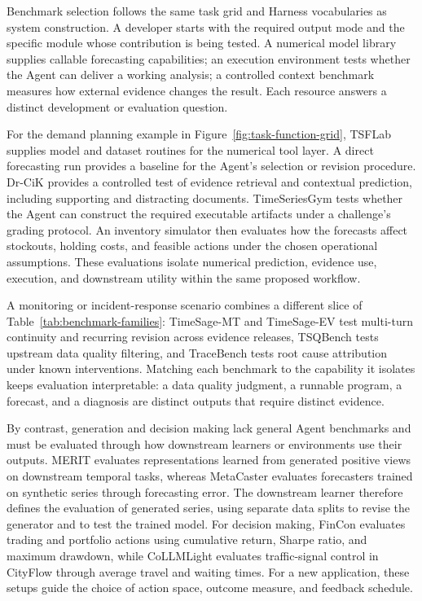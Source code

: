 \documentclass[preprints,article,submit,moreauthors]{Definitions/mdpi}
\begin{document}
Benchmark selection follows the same task grid and Harness vocabularies as system construction. A developer starts with the required output mode and the specific module whose contribution is being tested. A numerical model library supplies callable forecasting capabilities; an execution environment tests whether the Agent can deliver a working analysis; a controlled context benchmark measures how external evidence changes the result. Each resource answers a distinct development or evaluation question.

For the demand planning example in Figure~\ref{fig:task-function-grid}, TSFLab \citep{tsflab2026} supplies model and dataset routines for the numerical tool layer. A direct forecasting run provides a baseline for the Agent's selection or revision procedure. Dr-CiK \citep{drcik2026} provides a controlled test of evidence retrieval and contextual prediction, including supporting and distracting documents. TimeSeriesGym \citep{timeseriesgym2025} tests whether the Agent can construct the required executable artifacts under a challenge's grading protocol. An inventory simulator then evaluates how the forecasts affect stockouts, holding costs, and feasible actions under the chosen operational assumptions. These evaluations isolate numerical prediction, evidence use, execution, and downstream utility within the same proposed workflow.

A monitoring or incident-response scenario combines a different slice of Table~\ref{tab:benchmark-families}: TimeSage-MT \citep{timesagemt2026} and TimeSage-EV \citep{timesageev2026} test multi-turn continuity and recurring revision across evidence releases, TSQBench \citep{tsqbench2026} tests upstream data quality filtering, and TraceBench \citep{tracebench2026} tests root cause attribution under known interventions. Matching each benchmark to the capability it isolates keeps evaluation interpretable: a data quality judgment, a runnable program, a forecast, and a diagnosis are distinct outputs that require distinct evidence.

By contrast, generation and decision making lack general Agent benchmarks and must be evaluated through how downstream learners or environments use their outputs. MERIT \citep{merit2025} evaluates representations learned from generated positive views on downstream temporal tasks, whereas MetaCaster \citep{metacaster2026} evaluates forecasters trained on synthetic series through forecasting error. The downstream learner therefore defines the evaluation of generated series, using separate data splits to revise the generator and to test the trained model. For decision making, FinCon \citep{fincon2024} evaluates trading and portfolio actions using cumulative return, Sharpe ratio, and maximum drawdown, while CoLLMLight \citep{collmllight2026} evaluates traffic-signal control in CityFlow through average travel and waiting times. For a new application, these setups guide the choice of action space, outcome measure, and feedback schedule.
\end{document}
